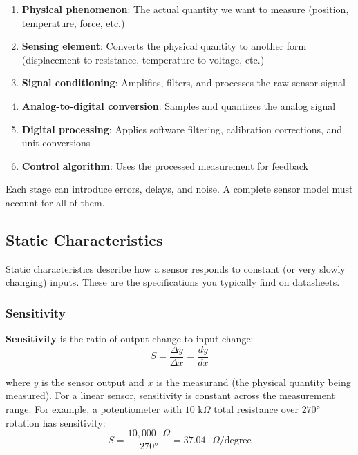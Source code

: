 \begin{enumerate}
    \item \textbf{Physical phenomenon}: The actual quantity we want to measure (position, temperature, force, etc.)
    \item \textbf{Sensing element}: Converts the physical quantity to another form (displacement to resistance, temperature to voltage, etc.)
    \item \textbf{Signal conditioning}: Amplifies, filters, and processes the raw sensor signal
    \item \textbf{Analog-to-digital conversion}: Samples and quantizes the analog signal
    \item \textbf{Digital processing}: Applies software filtering, calibration corrections, and unit conversions
    \item \textbf{Control algorithm}: Uses the processed measurement for feedback
\end{enumerate}

Each stage can introduce errors, delays, and noise. A complete sensor model must account for all of them.

\subsection{Static Characteristics}

Static characteristics describe how a sensor responds to constant (or very slowly changing) inputs. These are the specifications you typically find on datasheets.

\subsubsection{Sensitivity}

\textbf{Sensitivity} is the ratio of output change to input change:
\begin{equation}
S = \frac{\Delta y}{\Delta x} = \frac{dy}{dx}
\label{eq:sensitivity}
\end{equation}

where $y$ is the sensor output and $x$ is the measurand (the physical quantity being measured). For a linear sensor, sensitivity is constant across the measurement range. For example, a potentiometer with $10\text{ k}\Omega$ total resistance over $270°$ rotation has sensitivity:
\begin{equation}
S = \frac{10{,}000\text{ }\Omega}{270°} = 37.04\text{ }\Omega/\text{degree}
\end{equation}

